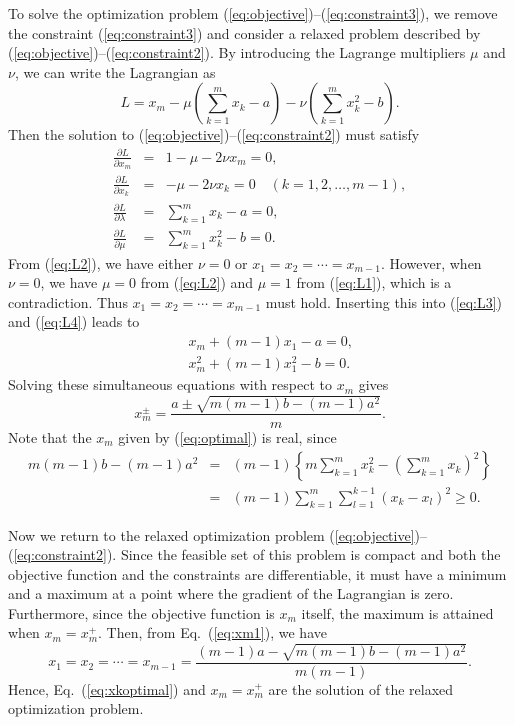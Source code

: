 \documentclass{amsart}
\newcommand{\p}{\partial}
\begin{document}
To solve the optimization problem (\ref{eq:objective})--(\ref{eq:constraint3}), we remove the constraint (\ref{eq:constraint3}) and consider a relaxed problem described by (\ref{eq:objective})--(\ref{eq:constraint2}). By introducing the Lagrange multipliers $\mu$ and $\nu$, we can write the Lagrangian as
\begin{equation}
L = x_m - \mu\left(\sum_{k=1}^m x_k - a\right) - \nu\left(\sum_{k=1}^m x_k^2 - b\right).
\end{equation}
Then the solution to (\ref{eq:objective})--(\ref{eq:constraint2}) must satisfy
\begin{eqnarray}
\frac{\p L}{\p x_m} &=& 1-\mu-2\nu x_m = 0, \label{eq:L1} \\
\frac{\p L}{\p x_k} &=& -\mu-2\nu x_k = 0 \quad(k=1, 2, \ldots, m-1), \label{eq:L2} \\
\frac{\p L}{\p \lambda} &=& \sum_{k=1}^m x_k - a = 0, \label{eq:L3} \\
\frac{\p L}{\p \mu} &=& \sum_{k=1}^m x_k^2 - b = 0. \label{eq:L4}
\end{eqnarray}
From (\ref{eq:L2}), we have either $\nu=0$ or $x_1=x_2=\cdots=x_{m-1}$. However, when $\nu=0$, we have $\mu=0$ from (\ref{eq:L2}) and $\mu=1$ from (\ref{eq:L1}), which is a contradiction. Thus $x_1=x_2=\cdots=x_{m-1}$ must hold. Inserting this into (\ref{eq:L3}) and (\ref{eq:L4}) leads to
\begin{eqnarray}
&& x_m + (m-1)x_1 - a = 0, \label{eq:xm1} \\
&& x_m^2 + (m-1)x_1^2 - b = 0.
\end{eqnarray}
Solving these simultaneous equations with respect to $x_m$ gives
\begin{equation}
x_m^{\pm} = \frac{a\pm\sqrt{m(m-1)b-(m-1)a^2}}{m} \label{eq:optimal}.
\end{equation}
Note that the $x_m$ given by (\ref{eq:optimal}) is real, since
\begin{eqnarray}
m(m-1)b-(m-1)a^2 &=& (m-1)\left\{m\sum_{k=1}^m x_k^2-\left(\sum_{k=1}^m x_k\right)^2\right\} \nonumber \\
&=& (m-1)\sum_{k=1}^m\sum_{l=1}^{k-1}(x_k-x_l)^2 \ge 0.
\label{eq:alphalower}
\end{eqnarray}

Now we return to the relaxed optimization problem (\ref{eq:objective})--(\ref{eq:constraint2}). Since the feasible set of this problem is compact and both the objective function and the constraints are differentiable, it must have a minimum and a maximum at a point where the gradient of the Lagrangian is zero. Furthermore, since the objective function is $x_m$ itself, the maximum is attained when $x_m=x_m^+$. Then, from Eq.~(\ref{eq:xm1}), we have
\begin{equation}
x_1 = x_2 = \cdots = x_{m-1} = \frac{(m-1)a-\sqrt{m(m-1)b-(m-1)a^2}}{m(m-1)}. \label{eq:xkoptimal}
\end{equation}
Hence, Eq.~(\ref{eq:xkoptimal}) and $x_m=x_m^+$ are the solution of the relaxed optimization problem.
\end{document}
